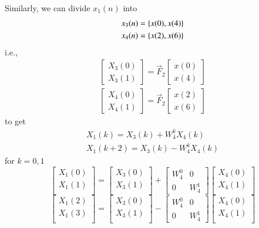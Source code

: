 \documentclass[journal,12pt,twocolumn]{IEEEtran}
\newcommand{\mymat}[1]{\ensuremath{\begin{bmatrix}#1\end{bmatrix}}}
\renewcommand\thesection{\arabic{section}}
\begin{document}
\begin{enumerate}[label=\thesection.\arabic*]
Similarly, we can divide $x_1(n)$ into 
\begin{align}
	x_3(n) = \left\{x(0), x(4)\right\} \\
	x_4(n) = \left\{x(2), x(6)\right\}
\end{align}
i.e.,
\begin{align}
	\mymat{X_3(0) \\ X_3(1)} = \vec{F}_2 \mymat{x(0) \\ x(4)} \\
	\mymat{X_4(0) \\ X_4(1)} = \vec{F}_2 \mymat{x(2) \\ x(6)}
\end{align}
to get
\begin{align}
	X_1(k) = X_3(k) + W_4^k X_4(k) \\
	X_1(k + 2) = X_3(k) - W_4^k X_4(k) 
\end{align}
for $k = 0, 1$
\begin{equation}
\begin{bmatrix}
X_{1}(0) \\ 
X_{1}(1)\\ 
\end{bmatrix}
=
\begin{bmatrix}
X_{3}(0) \\ 
X_{3}(1)\\ 
\end{bmatrix}
+
\begin{bmatrix}
W^{0}_{4} & 0\\
0 & W^{1}_{4}
\end{bmatrix}
\begin{bmatrix}
X_{4}(0) \\ 
X_{4}(1) \\ 
\end{bmatrix}
\end{equation}
\begin{equation}
\begin{bmatrix}
X_{1}(2) \\ 
X_{1}(3)\\ 
\end{bmatrix}
=
\begin{bmatrix}
X_{3}(0) \\ 
X_{3}(1)\\ 
\end{bmatrix}
-
\begin{bmatrix}
W^{0}_{4} & 0\\
0 & W^{1}_{4}
\end{bmatrix}
\begin{bmatrix}
X_{4}(0) \\ 
X_{4}(1) \\ 
\end{bmatrix}
\end{equation}


\end{enumerate}
\end{document}

